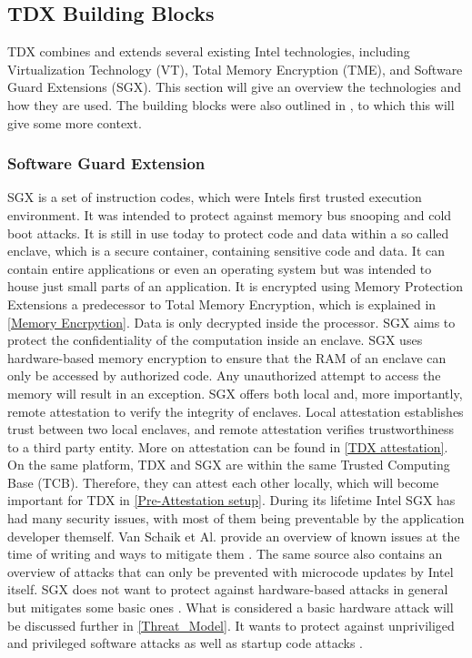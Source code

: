 \subsection{TDX Building Blocks}
\label{sec:tdxBuildingBlocks}
TDX combines and extends several existing Intel technologies, including Virtualization Technology (VT), Total Memory Encryption (TME), and Software Guard Extensions (SGX). This section will give an overview the technologies and how they are used. The building blocks were also outlined in \cite{cheng_intel_2023}, to which this will give some more context.
\subsubsection{Software Guard Extension}
SGX is a set of instruction codes, which were Intels first trusted execution environment. It was intended to protect against memory bus snooping and cold boot attacks. It is still in use today to protect code and data within a so called enclave, which is a secure container, containing sensitive code and data. It can contain entire applications or even an operating system but was intended to house just small parts of an application. It is encrypted using Memory Protection Extensions a predecessor to Total Memory Encryption, which is explained in \cref{Memory Encrpytion}. Data is only decrypted inside the processor\cite{intel_corporation_overview--intel-sgx-enclave_nodate}. SGX aims to protect the confidentiality of the computation inside an enclave. SGX uses hardware-based memory encryption to ensure that the RAM of an enclave can only be accessed by authorized code. Any unauthorized attempt to access the memory will result in an exception. SGX offers both local and, more importantly, remote attestation to verify the integrity of enclaves. Local attestation establishes trust between two local enclaves, and remote attestation verifies trustworthiness to a third party entity. More on attestation can be found in \cref{TDX attestation}. On the same platform, TDX and SGX are within the same Trusted Computing Base (TCB).  Therefore, they can attest each other locally\cite{intel_corporation_dcap_2024-1}, which will become important for TDX in \cref{Pre-Attestation setup}. During its lifetime Intel SGX has had many security issues, with most of them being preventable by the application developer themself. Van Schaik et Al. provide an overview of known issues at the time of writing and ways to mitigate them \cite{sgxfail}. The same source also contains an overview of attacks that can only be prevented with microcode updates by Intel itself. SGX does not want to protect against hardware-based attacks in general but mitigates some basic ones \cite{costan_intel_2016}. What is considered a basic hardware attack will be discussed further in \cref{Threat_Model}. It wants to protect against unpriviliged and privileged software attacks as well as startup code attacks \cite{schutz_general_nodate}.
